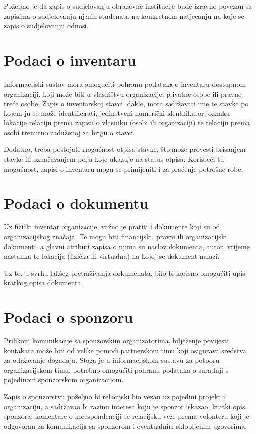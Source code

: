 \documentclass[times, utf8, diplomski]{fer}
\begin{document}
Poželjno je da zapis o sudjelovanju obrazovne institucije bude izravno povezan
sa zapisima o sudjelovanju njenih studenata na konkretnom natjecanju na koje se
zapis o sudjelovanju odnosi.

\section{Podaci o inventaru}

Informacijski sustav mora omogućiti pohranu podataka o inventaru dostupnom
organizaciji, koji može biti u vlasništvu organizacije, privatne osobe ili
pravne treće osobe. Zapis o inventarskoj stavci, dakle, mora sadržavati ime te
stavke po kojem ju se može identificirati, jedinstveni numerički identifikator,
oznaku lokacije relaciju prema zapisu o vlasniku (osobi ili organizaciji) te
relaciju prema osobi trenutno zaduženoj za brigu o stavci.

Dodatno, treba postojati mogućnost otpisa stavke, što može provesti brisanjem
stavke ili označavanjem polja koje ukazuje na status otpisa. Koristeći tu
mogućnost, zapisi o inventaru mogu se primijeniti i za praćenje potrošne robe.

\section{Podaci o dokumentu}

Uz fizički inventar organizacije, važno je pratiti i dokumente koji su od
organizacijskog značaja. To mogu biti financijski, pravni ili organizacijski
dokumenti, a glavni atributi zapisa o njima su naslov dokumenta, autor, vrijeme
nastanka te lokacija (fizička ili virtualna) na kojoj se dokument nalazi.

Uz to, u svrhu lakšeg pretraživanja dokumenata, bilo bi korisno omogućiti upis
kratkog opisa dokumenta.

\section{Podaci o sponzoru}

Prilikom komunikacije sa sponzorskim organizatorima, bilježenje povijesti
kontakata može biti od velike pomoći partnerskom timu koji osigurava sredstva za
održavanje događaja. Stoga je u informacijskom sustavu za potporu
organizacijskom timu, potrebno omogućiti pohranu podataka o suradnji s pojedinom
sponzorskom organizacijom.

Zapis o sponzorstvu poželjno bi relacijski bio vezan uz pojedini projekt i
organizaciju, a sadržavao bi razinu interesa koju je sponzor iskazao, kratki
opis sponzora, komentare o korespondenciji te relacijsku veze prema volonteru koji
je odgovoran za komunikaciju sa sponzorom i eventualnim sklopljenim ugovorima.
\end{document}
